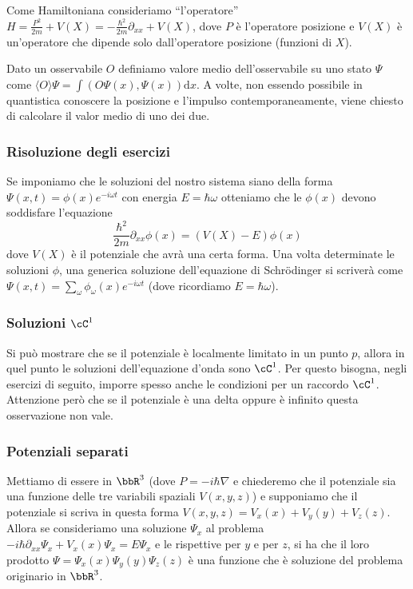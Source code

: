 \documentclass[10pt,a4paper]{article}
\newcommand{\de}{{\ensuremath{ \mbox{d}}}}
\begin{document}
\begin{multicols}{2}
  Come Hamiltoniana consideriamo ``l'operatore'' $H = \frac{P^2}{2m} + V(X) = - \frac{\hbar^2}{2m} \partial_{xx} + V(X)$, dove $P$ è l'operatore posizione e $V(X)$ è un'operatore che dipende solo dall'operatore posizione (funzioni di $X$).

  Dato un osservabile $O$ definiamo valore medio dell'osservabile su uno stato $\Psi$ come $\langle O \rangle \Psi = \int (O\Psi(x), \Psi(x)) \de x$. A volte, non essendo possibile in quantistica conoscere la posizione e l'impulso contemporaneamente, viene chiesto di calcolare il valor medio di uno dei due.
  
  \subsubsection*{Risoluzione degli esercizi}
  Se imponiamo che le soluzioni del nostro sistema siano della forma $\Psi(x, t) = \phi(x) e^{-i\omega t}$ con energia $E = \hbar \omega$ otteniamo che le $\phi(x)$ devono soddisfare l'equazione
  $$ \frac{\hbar^2}{2m} \partial_{xx} \phi(x) = (V(X) - E) \phi(x) $$
  dove $V(X)$ è il potenziale che avrà una certa forma. Una volta determinate le soluzioni $\phi$, una generica soluzione dell'equazione di Schrödinger si scriverà come $\Psi(x, t) = \sum_\omega \phi_\omega(x) e^{-i \omega t}$ (dove ricordiamo $E = \hbar \omega$).

  \subsubsection*{Soluzioni $\cC^1$}
  Si può mostrare che se il potenziale è localmente limitato in un punto $p$, allora in quel punto le soluzioni dell'equazione d'onda sono $\cC^1$. Per questo bisogna, negli esercizi di seguito, imporre spesso anche le condizioni per un raccordo $\cC^1$. Attenzione però che se il potenziale è una delta oppure è infinito questa osservazione non vale.
  
  \subsubsection*{Potenziali separati}
  Mettiamo di essere in $\bbR^3$ (dove $P = - i \hbar \nabla$ e chiederemo che il potenziale sia una funzione delle tre variabili spaziali $V(x, y, z)$) e supponiamo che il potenziale si scriva in questa forma $V(x, y, z) = V_x(x) + V_y(y) + V_z(z)$. Allora se consideriamo una soluzione $\Psi_x$ al problema $- i \hbar \partial_{xx}\Psi_x + V_x(x) \Psi_x = E \Psi_x$ e le rispettive per $y$ e per $z$, si ha che il loro prodotto $\Psi = \Psi_x(x)\Psi_y(y)\Psi_z(z)$ è una funzione che è soluzione del problema originario in $\bbR^3$.


\end{multicols}
\end{document}
